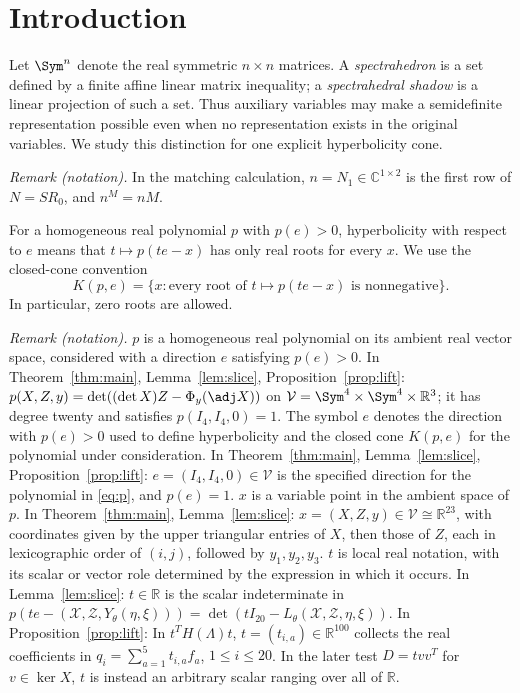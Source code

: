 \section{Introduction}
\label{sec:introduction}

Let $\Sym^n$ denote the real symmetric $n\times n$ matrices. A
\emph{spectrahedron} is a set defined by a finite affine linear matrix
inequality; a \emph{spectrahedral shadow} is a linear projection of such
a set. Thus auxiliary variables may make a semidefinite representation
possible even when no representation exists in the original variables.
We study this distinction for one explicit hyperbolicity cone.

\noindent\textit{Remark (notation).} In the matching calculation, $n=N_1\in\mathbb C^{1\times2}$ is the first row of $N=SR_0$, and $n^M=nM$.


For a homogeneous real polynomial $p$ with $p(e)>0$, hyperbolicity with
respect to $e$ means that $t\mapsto p(te-x)$ has only real roots for
every $x$. We use the closed-cone convention
\[
 K(p,e)=\{x:\text{every root of }t\mapsto p(te-x)
                    \text{ is nonnegative}\}.
\]
In particular, zero roots are allowed.

\noindent\textit{Remark (notation).} $p$ is a homogeneous real polynomial on its ambient real vector space, considered with a direction $e$ satisfying $p(e)>0$. In Theorem~\ref{thm:main}, Lemma~\ref{lem:slice}, Proposition~\ref{prop:lift}: $p(X,Z,y)=\det\!\left((\det X)Z-\Phi_y(\adj X)\right)$ on $\mathcal V=\Sym^4\times\Sym^4\times\mathbb R^3$; it has degree twenty and satisfies $p(I_4,I_4,0)=1$. The symbol $e$ denotes the direction with $p(e)>0$ used to define hyperbolicity and the closed cone $K(p,e)$ for the polynomial under consideration. In Theorem~\ref{thm:main}, Lemma~\ref{lem:slice}, Proposition~\ref{prop:lift}: $e=(I_4,I_4,0)\in\mathcal V$ is the specified direction for the polynomial in \eqref{eq:p}, and $p(e)=1$. $x$ is a variable point in the ambient space of $p$. In Theorem~\ref{thm:main}, Lemma~\ref{lem:slice}: $x=(X,Z,y)\in\mathcal V\cong\mathbb R^{23}$, with coordinates given by the upper triangular entries of $X$, then those of $Z$, each in lexicographic order of $(i,j)$, followed by $y_1,y_2,y_3$. $t$ is local real notation, with its scalar or vector role determined by the expression in which it occurs. In Lemma~\ref{lem:slice}: $t\in\mathbb R$ is the scalar indeterminate in $p(te-(\mathcal X,\mathcal Z,Y_\theta(\eta,\xi)))=\det(tI_{20}-L_\theta(\mathcal X,\mathcal Z,\eta,\xi))$. In Proposition~\ref{prop:lift}: In $t^TH(\Lambda)t$, $t=(t_{i,a})\in\mathbb R^{100}$ collects the real coefficients in $q_i=\sum_{a=1}^5t_{i,a}f_a$, $1\leq i\leq20$. In the later test $D=t vv^T$ for $v\in\ker X$, $t$ is instead an arbitrary scalar ranging over all of $\mathbb R$.


